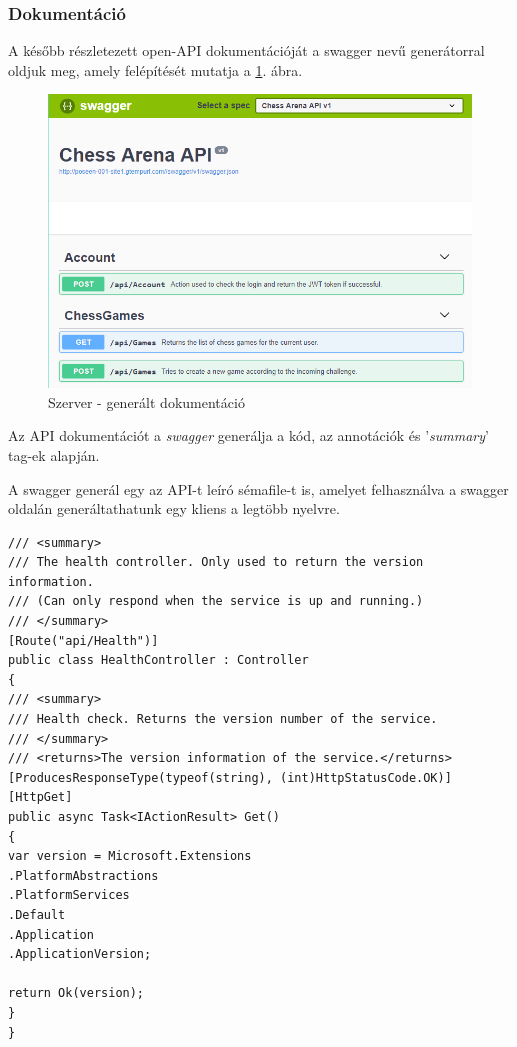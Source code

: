 \documentclass[twoside, a4paper, 12pt]{article}
\begin{document}
\subsubsection{Dokumentáció}
A később részletezett open-API dokumentációját a swagger nevű generátorral oldjuk meg, amely felépítését mutatja a \ref{fig:serverUiDocumentation}. ábra.

\begin{figure}[htbp]
	\centering
	\includegraphics[width=1.0\textwidth]{img/serverUiDocumentation.png}
	\caption{Szerver - generált dokumentáció}
	\label{fig:serverUiDocumentation}
\end{figure}
Az API dokumentációt a \textit{swagger}\cite{swaggerHomepage} generálja a kód, az annotációk és '\textit{summary}' tag-ek alapján.

A swagger generál egy az API-t leíró sémafile-t is, amelyet felhasználva a swagger oldalán generáltathatunk egy kliens a legtöbb nyelvre.

\begin{lstlisting}[caption=Health-check példakód 'summary' tag-ekkel., label=lst:healtcheck]
/// <summary>
/// The health controller. Only used to return the version information.
/// (Can only respond when the service is up and running.)
/// </summary>
[Route("api/Health")]
public class HealthController : Controller
{
/// <summary>
/// Health check. Returns the version number of the service.
/// </summary>
/// <returns>The version information of the service.</returns>
[ProducesResponseType(typeof(string), (int)HttpStatusCode.OK)]
[HttpGet]
public async Task<IActionResult> Get()
{
var version = Microsoft.Extensions
.PlatformAbstractions
.PlatformServices
.Default
.Application
.ApplicationVersion;

return Ok(version);
}
}
\end{lstlisting}
\end{document}

